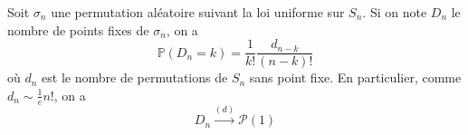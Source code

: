 
  \begin{application}
    Soit $\sigma_n$ une permutation aléatoire suivant la loi uniforme sur $S_n$. Si on note $D_n$ le nombre de points fixes de $\sigma_n$, on a
    \[ \mathbb{P}(D_n = k) = \frac{1}{k!} \frac{d_{n-k}}{(n-k)!} \]
    où $d_n$ est le nombre de permutations de $S_n$ sans point fixe. En particulier, comme $d_n \sim \frac{1}{e} n!$, on a
    \[ D_n \overset{(d)}{\longrightarrow} \mathcal{P}(1) \]
  \end{application}

